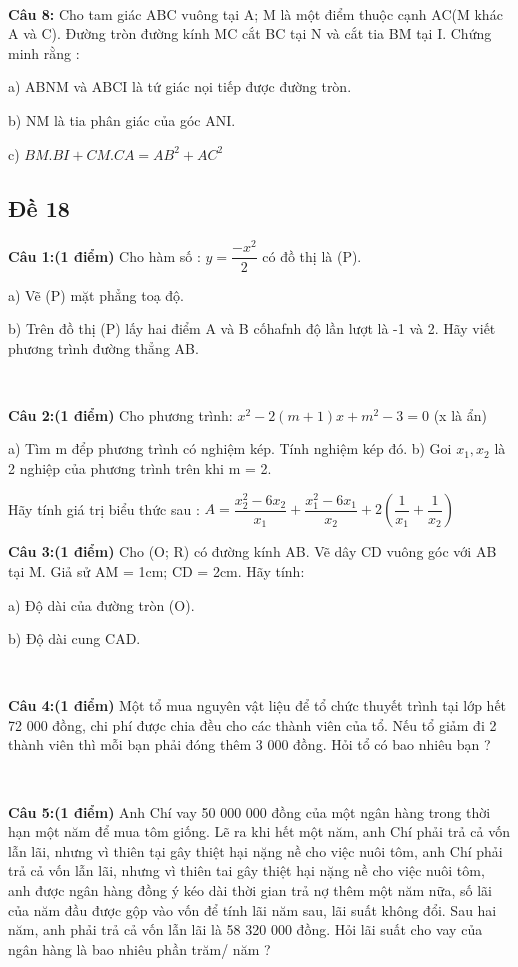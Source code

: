 \documentclass[12pt]{article}
\begin{document}
\    

\textbf{Câu 8:} Cho tam giác ABC vuông tại A; M là một điểm thuộc cạnh AC(M khác A và C). Đường tròn đường kính MC cắt BC tại N và cắt tia BM tại I. Chứng minh rằng : \par
a) ABNM và ABCI là tứ giác nọi tiếp được đường tròn. \par
b) NM là tia phân giác của góc ANI. \par
c) $BM.BI + CM.CA = AB^2 + AC^2$

\break

\subsection{Đề 18}

\textbf{Câu 1:(1 điểm)} Cho hàm số : $y = \dfrac{-x^2}{2}$ có đồ thị là (P). \par
a) Vẽ (P) mặt phẳng toạ độ. \par
b) Trên đồ thị (P) lấy hai điểm A và B cốhafnh độ lần lượt là -1 và 2. Hãy viết phương trình đường thẳng AB. \par

\   

\textbf{Câu 2:(1 điểm)} Cho phương trình: $x^2 - 2(m + 1)x + m^2 - 3 = 0$ (x là ẩn) \par
a) Tìm m đểp phương trình có nghiệm kép. Tính nghiệm kép đó.
b) Goi $x_1, x_2$ là 2 nghiệp của phương trình trên khi m = 2. \par
Hãy tính giá trị biểu thức sau : $A = \dfrac{x_2^2-6x_2}{x_1} + \dfrac{x_1^2-6x_1}{x_2} + 2(\dfrac{1}{x_1} + \dfrac{1}{x_2})$ \par

\textbf{Câu 3:(1 điểm)} Cho (O; R) có đường kính AB. Vẽ dây CD vuông góc với AB tại M. Giả sử AM = 1cm; CD = 2cm. Hãy tính: \par
a) Độ dài của đường tròn (O). \par
b) Độ dài cung CAD. \par

\   

\textbf{Câu 4:(1 điểm)} Một tổ mua nguyên vật liệu để tổ chức thuyết trình tại lớp hết 72 000 đồng, chi phí được chia đều cho các thành viên của tổ. Nếu tổ giảm đi 2 thành viên thì mỗi bạn phải đóng thêm 3 000 đồng. Hỏi tổ có bao nhiêu bạn ? \par

\   

\textbf{Câu 5:(1 điểm)} Anh Chí vay 50 000 000 đồng của một ngân hàng trong thời hạn một năm để mua tôm giống. Lẽ ra khi hết một năm, anh Chí phải trả cả vốn lẫn lãi, nhưng vì thiên tại gây thiệt hại nặng nề cho việc nuôi tôm, anh Chí phải trả cả vốn lẫn lãi, nhưng vì thiên tai gây thiệt hại nặng nề cho việc nuôi tôm, anh được ngân hàng đồng ý kéo dài thời gian trả nợ thêm một năm nữa, số lãi của năm đầu được gộp vào vốn để tính lãi năm sau, lãi suất không đổi. Sau hai năm, anh phải trả cả vốn lẫn lãi là 58 320 000 đồng. Hỏi lãi suất cho vay của ngân hàng là bao nhiêu phần trăm/ năm ?
\end{document}
